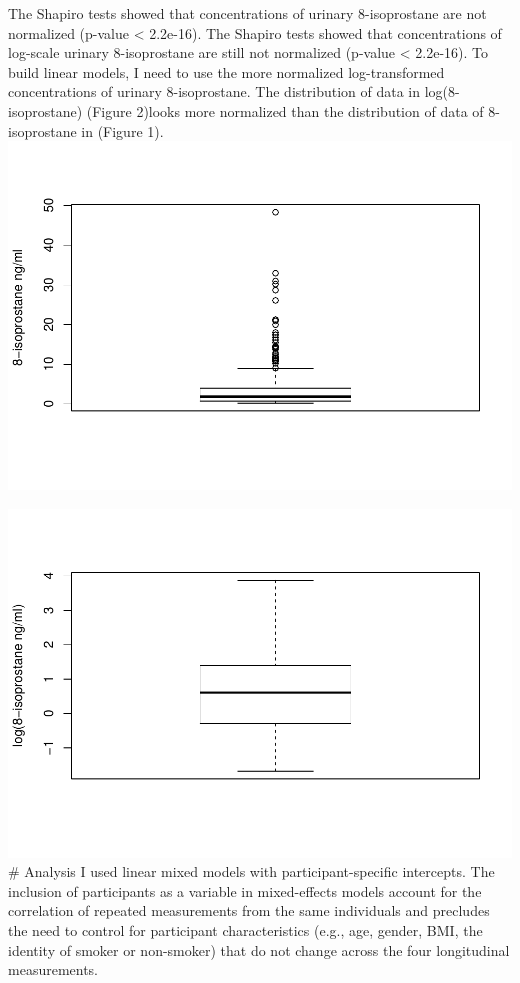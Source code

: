\documentclass[12pt,]{article}
\begin{document}
The Shapiro tests showed that concentrations of urinary 8-isoprostane
are not normalized (p-value \textless{} 2.2e-16). The Shapiro tests
showed that concentrations of log-scale urinary 8-isoprostane are still
not normalized (p-value \textless{} 2.2e-16). To build linear models, I
need to use the more normalized log-transformed concentrations of
urinary 8-isoprostane. The distribution of data in log(8-isoprostane)
(Figure 2)looks more normalized than the distribution of data of
8-isoprostane in (Figure 1).
\includegraphics{Wang_ENV872_Project_files/figure-latex/unnamed-chunk-6-1.pdf}

\includegraphics{Wang_ENV872_Project_files/figure-latex/unnamed-chunk-7-1.pdf}
\# Analysis I used linear mixed models with participant-specific
intercepts. The inclusion of participants as a variable in mixed-effects
models account for the correlation of repeated measurements from the
same individuals and precludes the need to control for participant
characteristics (e.g., age, gender, BMI, the identity of smoker or
non-smoker) that do not change across the four longitudinal
measurements.
\end{document}
